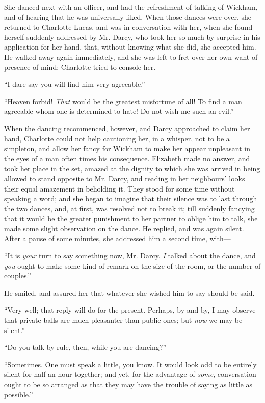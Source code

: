 \documentclass[12pt,openright]{book}
\begin{document}
She danced next with an officer, and had the refreshment of talking of Wickham, and of hearing that he was universally liked. When those dances were over, she returned to Charlotte Lucas, and was in conversation with her, when she found herself suddenly addressed by Mr. Darcy, who took her so much by surprise in his application for her hand, that, without knowing what she did, she accepted him. He walked away again immediately, and she was left to fret over her own want of presence of mind: Charlotte tried to console her.

“I dare say you will find him very agreeable.”

“Heaven forbid! \textit{That} would be the greatest misfortune of all! To find a man agreeable whom one is determined to hate! Do not wish me such an evil.”

When the dancing recommenced, however, and Darcy approached to claim her hand, Charlotte could not help cautioning her, in a whisper, not to be a simpleton, and allow her fancy for Wickham to make her appear unpleasant in the eyes of a man often times his consequence. Elizabeth made no answer, and took her place in the set, amazed at the dignity to which she was arrived in being allowed to stand opposite to Mr. Darcy, and reading in her neighbours’ looks their equal amazement in beholding it. They stood for some time without speaking a word; and she began to imagine that their silence was to last through the two dances, and, at first, was resolved not to break it; till suddenly fancying that it would be the greater punishment to her partner to oblige him to talk, she made some slight observation on the dance. He replied, and was again silent. After a pause of some minutes, she addressed him a second time, with—

“It is \textit{your} turn to say something now, Mr. Darcy. \textit{I} talked about the dance, and \textit{you} ought to make some kind of remark on the size of the room, or the number of couples.”

He smiled, and assured her that whatever she wished him to say should be said.

“Very well; that reply will do for the present. Perhaps, by-and-by, I may observe that private balls are much pleasanter than public ones; but \textit{now} we may be silent.”

“Do you talk by rule, then, while you are dancing?”

“Sometimes. One must speak a little, you know. It would look odd to be entirely silent for half an hour together; and yet, for the advantage of \textit{some}, conversation ought to be so arranged as that they may have the trouble of saying as little as possible.”
\end{document}
